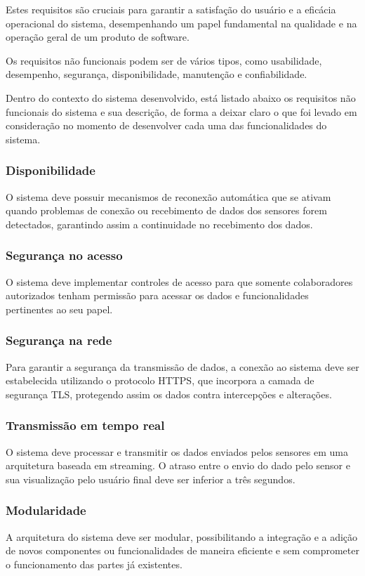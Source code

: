 Estes requisitos são cruciais para garantir a satisfação do usuário e a eficácia operacional do sistema, desempenhando um papel fundamental na qualidade e na operação geral de um produto de software.

Os requisitos não funcionais podem ser de vários tipos, como usabilidade, desempenho, segurança, disponibilidade, manutenção e confiabilidade.

Dentro do contexto do sistema desenvolvido, está listado abaixo os requisitos não funcionais do sistema e sua descrição, de forma a deixar claro o que foi levado em consideração no momento de desenvolver cada uma das funcionalidades do sistema.

\subsubsection{Disponibilidade}
O sistema deve possuir mecanismos de reconexão automática que se ativam quando problemas de conexão ou recebimento de dados dos sensores forem detectados, garantindo assim a continuidade no recebimento dos dados.

\subsubsection{Segurança no acesso}
O sistema deve implementar controles de acesso para que somente colaboradores autorizados tenham permissão para acessar os dados e funcionalidades pertinentes ao seu papel.

\subsubsection{Segurança na rede}
Para garantir a segurança da transmissão de dados, a conexão ao sistema deve ser estabelecida utilizando o protocolo HTTPS, que incorpora a camada de segurança TLS, protegendo assim os dados contra intercepções e alterações.

\subsubsection{Transmissão em tempo real}
O sistema deve processar e transmitir os dados enviados pelos sensores em uma arquitetura baseada em streaming. O atraso entre o envio do dado pelo sensor e sua visualização pelo usuário final deve ser inferior a três segundos.

\subsubsection{Modularidade}
A arquitetura do sistema deve ser modular, possibilitando a integração e a adição de novos componentes ou funcionalidades de maneira eficiente e sem comprometer o funcionamento das partes já existentes.



